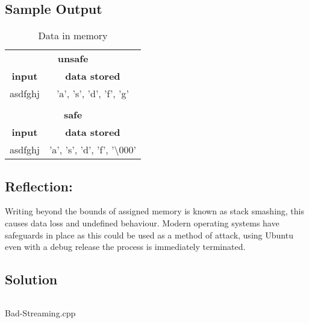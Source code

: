 \documentclass[Lab-B.tex]{subfiles}
\begin{document}
        \subsection{Sample Output}
            \begin{table}[H]
                \centering
                \begin{tabular}{c c}
                    \hline
                    \multicolumn{2}{c}{\textbf{unsafe}} \\
                    \textbf{input} & \textbf{data stored} \\
                    \hline
                    asdfghj & 'a', 's', 'd', 'f', 'g' \\
                    \\
                    \hline
                    \multicolumn{2}{c}{\textbf{safe}} \\
                    \textbf{input} & \textbf{data stored} \\
                    \hline
                    asdfghj & 'a', 's', 'd', 'f', '\textbackslash000' \\
                    
                \end{tabular}
                \caption{Data in memory}
            \end{table}

        \subsection*{Reflection:}
            Writing beyond the bounds of assigned memory is known as stack smashing,
            this causes data loss and undefined behaviour. Modern operating systems
            have safeguards in place as this could be used as a method of attack,
            using Ubuntu even with a debug release the process is immediately terminated.
        
        \subsection{Solution}
            \begin{listing}[H]
                \inputminted{cpp}{../Tasks/02-Bad-Streaming/Bad-Streaming.cpp}%
                \caption{Bad-Streaming.cpp}
            \end{listing}
\end{document}
